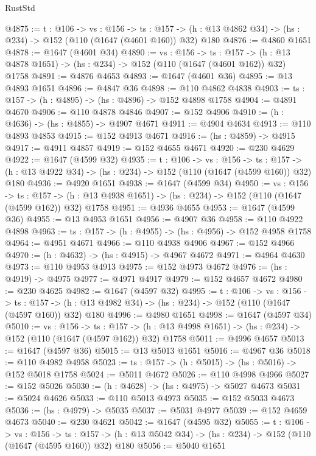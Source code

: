 \begin{lexlean}{RustStd}
\begin{coremodule}
@4875 := {t : @106} ->
  {vs : @156} ->
  {ts : @157} -> (h : @13 @4862 @34) -> (hs : @234) -> @152 (@110 (@1647 (@4601 @160)) @32) @180
@4876 := @4860 @1651
@4878 := @1647 (@4601 @34)
@4890 := {vs : @156} ->
  {ts : @157} -> (h : @13 @4878 @1651) -> (hs : @234) -> @152 (@110 (@1647 (@4601 @162)) @32) @1758
@4891 := @4876 @4653
@4893 := @1647 (@4601 @36)
@4895 := @13 @4893 @1651
@4896 := @4847 @36
@4898 := @110 @4862 @4838
@4903 := {ts : @157} -> (h : @4895) -> (hs : @4896) -> @152 @4898 @1758
@4904 := @4891 @4670
@4906 := @110 @4878 @4846
@4907 := @152 @4906
@4910 := (h : @4636) -> (hs : @4855) -> @4907 @4671
@4911 := @4904 @4634
@4913 := @110 @4893 @4853
@4915 := @152 @4913 @4671
@4916 := (hs : @4859) -> @4915
@4917 := @4911 @4857
@4919 := @152 @4655 @4671
@4920 := @230 @4629
@4922 := @1647 (@4599 @32)
@4935 := {t : @106} ->
  {vs : @156} ->
  {ts : @157} -> (h : @13 @4922 @34) -> (hs : @234) -> @152 (@110 (@1647 (@4599 @160)) @32) @180
@4936 := @4920 @1651
@4938 := @1647 (@4599 @34)
@4950 := {vs : @156} ->
  {ts : @157} -> (h : @13 @4938 @1651) -> (hs : @234) -> @152 (@110 (@1647 (@4599 @162)) @32) @1758
@4951 := @4936 @4655
@4953 := @1647 (@4599 @36)
@4955 := @13 @4953 @1651
@4956 := @4907 @36
@4958 := @110 @4922 @4898
@4963 := {ts : @157} -> (h : @4955) -> (hs : @4956) -> @152 @4958 @1758
@4964 := @4951 @4671
@4966 := @110 @4938 @4906
@4967 := @152 @4966
@4970 := (h : @4632) -> (hs : @4915) -> @4967 @4672
@4971 := @4964 @4630
@4973 := @110 @4953 @4913
@4975 := @152 @4973 @4672
@4976 := (hs : @4919) -> @4975
@4977 := @4971 @4917
@4979 := @152 @4657 @4672
@4980 := @230 @4625
@4982 := @1647 (@4597 @32)
@4995 := {t : @106} ->
  {vs : @156} ->
  {ts : @157} -> (h : @13 @4982 @34) -> (hs : @234) -> @152 (@110 (@1647 (@4597 @160)) @32) @180
@4996 := @4980 @1651
@4998 := @1647 (@4597 @34)
@5010 := {vs : @156} ->
  {ts : @157} -> (h : @13 @4998 @1651) -> (hs : @234) -> @152 (@110 (@1647 (@4597 @162)) @32) @1758
@5011 := @4996 @4657
@5013 := @1647 (@4597 @36)
@5015 := @13 @5013 @1651
@5016 := @4967 @36
@5018 := @110 @4982 @4958
@5023 := {ts : @157} -> (h : @5015) -> (hs : @5016) -> @152 @5018 @1758
@5024 := @5011 @4672
@5026 := @110 @4998 @4966
@5027 := @152 @5026
@5030 := (h : @4628) -> (hs : @4975) -> @5027 @4673
@5031 := @5024 @4626
@5033 := @110 @5013 @4973
@5035 := @152 @5033 @4673
@5036 := (hs : @4979) -> @5035
@5037 := @5031 @4977
@5039 := @152 @4659 @4673
@5040 := @230 @4621
@5042 := @1647 (@4595 @32)
@5055 := {t : @106} ->
  {vs : @156} ->
  {ts : @157} -> (h : @13 @5042 @34) -> (hs : @234) -> @152 (@110 (@1647 (@4595 @160)) @32) @180
@5056 := @5040 @1651

\end{coremodule}
\end{lexlean}
